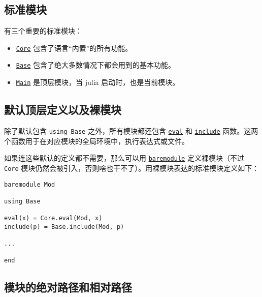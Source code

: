 \hypertarget{2129272965593313585}{}


\subsection{标准模块}



有三个重要的标准模块：



\begin{itemize}
\item \hyperlink{14876339894285762624}{\texttt{Core}} 包含了语言“内置”的所有功能。


\item \hyperlink{464144976511314225}{\texttt{Base}} 包含了绝大多数情况下都会用到的基本功能。


\item \hyperlink{7094459820733568273}{\texttt{Main}} 是顶层模块，当 julia 启动时，也是当前模块。

\end{itemize}


\hypertarget{3653095448809961286}{}


\subsection{默认顶层定义以及裸模块}



除了默认包含 \texttt{using Base} 之外，所有模块都还包含 \hyperlink{7507639810592563424}{\texttt{eval}} 和 \hyperlink{7507443674556842580}{\texttt{include}} 函数。这两个函数用于在对应模块的全局环境中，执行表达式或文件。



如果连这些默认的定义都不需要，那么可以用 \hyperlink{13329108222158426840}{\texttt{baremodule}} 定义裸模块（不过 \texttt{Core} 模块仍然会被引入，否则啥也干不了）。用裸模块表达的标准模块定义如下：




\begin{lstlisting}
baremodule Mod

using Base

eval(x) = Core.eval(Mod, x)
include(p) = Base.include(Mod, p)

...

end
\end{lstlisting}



\hypertarget{15942908766340569567}{}


\subsection{模块的绝对路径和相对路径}



